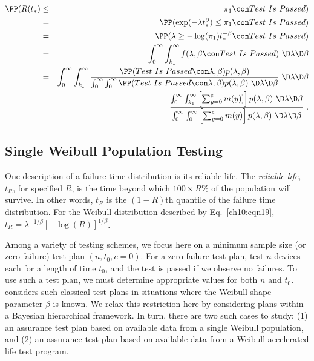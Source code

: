 \documentclass {book}
\begin{document}
\begin{eqnarray}\label{ch10:wpcr}
\PP(R(t_*) & \leq & \pi_1 \con Test\mbox{ }Is\mbox{ }Passed)\\
\mbox{} & = & \PP(\exp(-\lambda t_*^\beta) \leq \pi_1 \con
Test\mbox{ }Is\mbox{ }Passed)\nonumber\\ \mbox{} & = & \PP(\lambda
\geq -\log(\pi_1)t_*^{-\beta} \con Test\mbox{ }Is\mbox{ }Passed)\nonumber\\
\mbox{} & = & \int_{0}^{\infty} \int_{k_1}^{\infty} f(\lambda,
\beta \con
Test\mbox{ }Is\mbox{ }Passed) \, \, \D \lambda \D \beta\nonumber\\
\mbox{} & = & \int_{0}^{\infty} \int_{k_1}^{\infty}
\frac{\PP(Test\mbox{ }Is\mbox{ }Passed \con \lambda, \beta)
p(\lambda,\beta)}{\int_0^{\infty}\int_0^{\infty} \PP(Test\mbox{
}Is\mbox{ }Passed \con \lambda, \beta) p(\lambda,\beta) \, \, \D
\lambda \D \beta} \, \, \D \lambda \D \beta\nonumber\\ \mbox{} & =
& \frac{\int_{0}^{\infty} \int_{k_1}^{\infty} \left[\sum_{y=0}^{c}
m(y)] \right] p(\lambda,\beta) \, \, \D \lambda \D
\beta}{\int_0^{\infty}\int_0^{\infty} \left[\sum_{y=0}^{c} m(y)
\right] p(\lambda,\beta) \, \, \D \lambda \D \beta}\nonumber \, \,
.
\end{eqnarray}

\subsection{Single Weibull Population
Testing}\label{ch10:sec4:ss1} One description of a failure
time distribution is its reliable life. The \emph{reliable
life}, $t_{R}$, for specified $R$, is
the time beyond which $100 \times R\%$ of the population will
survive. In other words, $t_{R}$ is the $(1 - R)$th quantile of
the failure time distribution. For the Weibull distribution
described by Eq.~\ref{ch10:eqn19}, $t_{R} =
\lambda^{-1/\beta}[-\log (R)]^{1/\beta}$.

Among a variety of testing schemes, we focus here on a minimum
sample size (or zero-failure) test plan $(n,
t_{0},c=0)$. For a zero-failure test
plan, test $n$ devices each for a length of time $t_{0}$, and the
test is passed if we observe no failures. To use such a test plan,
we must determine appropriate values for both $n$ and $t_{0}$.
\citet{ME98} considers such classical test plans in situations
where the Weibull shape parameter $\beta$ is known. We relax this
restriction here by considering plans within a Bayesian
hierarchical framework. In turn, there are two such cases to
study: (1) an assurance test plan based on available data from a
single Weibull population, and (2) an assurance test plan based on
available data from a Weibull accelerated life test
program. 
\end{document}
